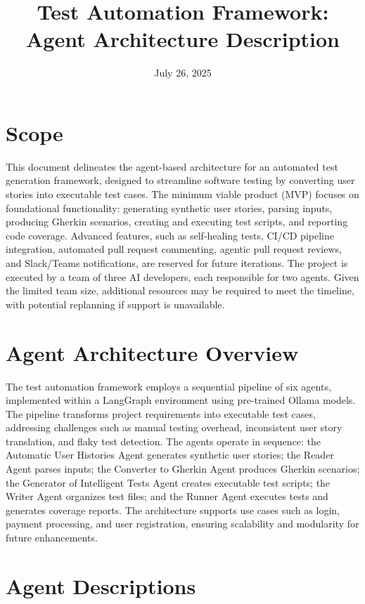 \documentclass{article}
\title{Test Automation Framework: Agent Architecture Description}
\author{}
\date{July 26, 2025}
\begin{document}
\maketitle

\section{Scope}
This document delineates the agent-based architecture for an automated test generation framework, designed to streamline software testing by converting user stories into executable test cases. The minimum viable product (MVP) focuses on foundational functionality: generating synthetic user stories, parsing inputs, producing Gherkin scenarios, creating and executing test scripts, and reporting code coverage. Advanced features, such as self-healing tests, CI/CD pipeline integration, automated pull request commenting, agentic pull request reviews, and Slack/Teams notifications, are reserved for future iterations. The project is executed by a team of three AI developers, each responsible for two agents. Given the limited team size, additional resources may be required to meet the timeline, with potential replanning if support is unavailable.

\section{Agent Architecture Overview}
The test automation framework employs a sequential pipeline of six agents, implemented within a LangGraph environment using pre-trained Ollama models. The pipeline transforms project requirements into executable test cases, addressing challenges such as manual testing overhead, inconsistent user story translation, and flaky test detection. The agents operate in sequence: the Automatic User Histories Agent generates synthetic user stories; the Reader Agent parses inputs; the Converter to Gherkin Agent produces Gherkin scenarios; the Generator of Intelligent Tests Agent creates executable test scripts; the Writer Agent organizes test files; and the Runner Agent executes tests and generates coverage reports. The architecture supports use cases such as login, payment processing, and user registration, ensuring scalability and modularity for future enhancements.

\section{Agent Descriptions}
\end{document}
